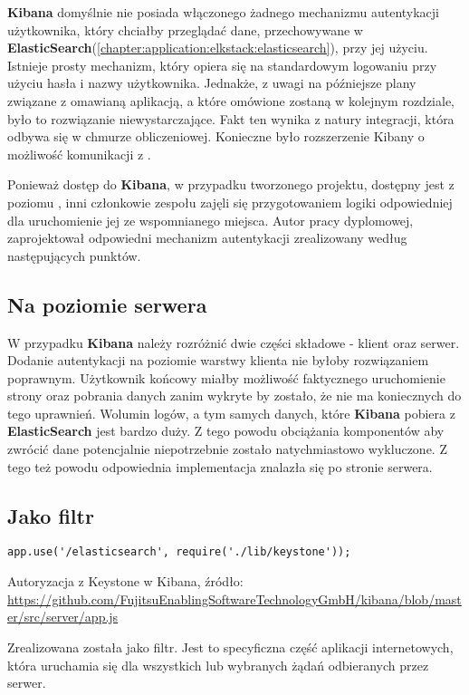 \textbf{Kibana} domyślnie nie posiada włączonego żadnego mechanizmu autentykacji użytkownika, który
chciałby przeglądać dane, przechowywane w \textbf{ElasticSearch}(\ref{chapter:application:elkstack:elasticsearch}), 
przy jej użyciu. Istnieje prosty mechanizm, który opiera się na standardowym logowaniu przy użyciu
hasła i nazwy użytkownika. Jednakże, z uwagi na późniejsze plany związane z omawianą aplikacją, a które 
omówione zostaną w kolejnym rozdziale, było to rozwiązanie niewystarczające. Fakt ten wynika z natury
integracji, która odbywa się w chmurze obliczeniowej. Konieczne było rozszerzenie Kibany o możliwość
komunikacji z .

Ponieważ dostęp do \textbf{Kibana}, w przypadku tworzonego projektu, dostępny jest z poziomu , inni
członkowie zespołu zajęli się przygotowaniem logiki odpowiedniej dla uruchomienie jej ze wspomnianego miejsca. Autor pracy 
dyplomowej, zaprojektował odpowiedni mechanizm autentykacji zrealizowany według następujących punktów.

    \subsection{Na poziomie serwera}
    W przypadku \textbf{Kibana} należy rozróżnić dwie części składowe - klient oraz serwer. Dodanie autentykacji
    na poziomie warstwy klienta nie byłoby rozwiązaniem poprawnym. Użytkownik końcowy miałby możliwość faktycznego
    uruchomienie strony oraz pobrania danych zanim wykryte by zostało, że nie ma koniecznych do tego uprawnień.
    Wolumin logów, a tym samych danych, które \textbf{Kibana} pobiera z \textbf{ElasticSearch} jest bardzo duży.
    Z tego powodu obciążania komponentów aby zwrócić dane potencjalnie niepotrzebnie zostało
    natychmiastowo wykluczone. Z tego też powodu odpowiednia implementacja znalazła się po stronie serwera.
    
    \subsection{Jako filtr}
    \begin{listing}
        \begin{verbatim}
app.use('/elasticsearch', require('./lib/keystone'));
        \end{verbatim}
        \label{chapter:application_own:own_work:kibana_and_keystone:filter_code}
        \caption[Autoryzacja z Keystone w Kibana]{Autoryzacja z Keystone w Kibana, źródło: \url{https://github.com/FujitsuEnablingSoftwareTechnologyGmbH/kibana/blob/master/src/server/app.js}}
    \end{listing}
    Zrealizowana została jako filtr. Jest to specyficzna część aplikacji internetowych, która
    uruchamia się dla wszystkich lub wybranych żądań odbieranych przez serwer.
    
